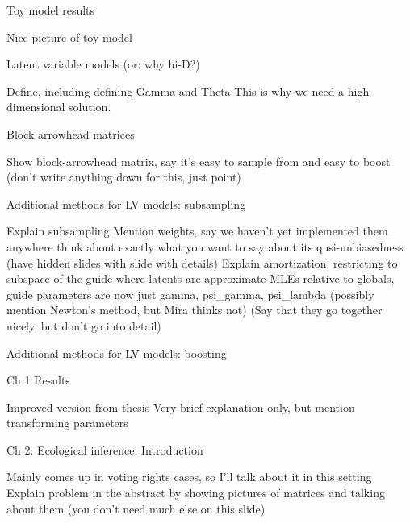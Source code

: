 \documentclass[ignorenonframetext,]{beamer}
\begin{document}
\begin{frame}{Toy model results}

Nice picture of toy model

\end{frame}

\begin{frame}{Latent variable models (or: why hi-D?)}

Define, including defining Gamma and Theta This is why we need a
high-dimensional solution.

\end{frame}

\begin{frame}{Block arrowhead matrices}

Show block-arrowhead matrix, say it's easy to sample from and easy to
boost (don't write anything down for this, just point)

\end{frame}

\begin{frame}{Additional methods for LV models: subsampling}

Explain subsampling Mention weights, say we haven't yet implemented them
anywhere think about exactly what you want to say about its
qusi-unbiasedness (have hidden slides with slide with details) Explain
amortization: restricting to subspace of the guide where latents are
approximate MLEs relative to globals, guide parameters are now just
gamma, psi\_gamma, psi\_lambda (possibly mention Newton's method, but
Mira thinks not) (Say that they go together nicely, but don't go into
detail)

\end{frame}

\begin{frame}{Additional methods for LV models: boosting}

\end{frame}

\begin{frame}{Ch 1 Results}

Improved version from thesis Very brief explanation only, but mention
transforming parameters

\end{frame}

\begin{frame}{Ch 2: Ecological inference. Introduction}

Mainly comes up in voting rights cases, so I'll talk about it in this
setting Explain problem in the abstract by showing pictures of matrices
and talking about them (you don't need much else on this slide)

\end{frame}
\end{document}
